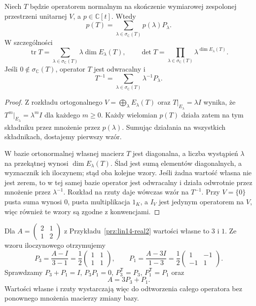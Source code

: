 \begin{wniosek}
\label{cor:lin14-functional-polynomial}
Niech \(T\) będzie operatorem normalnym
na skończenie wymiarowej zespolonej
przestrzeni unitarnej \(V\),
a \(p\in\mathbb C[t]\).
Wtedy
\[
 p(T)=\sum_{\lambda\in\sigma_{\mathbb C}(T)}
                                  p(\lambda)P_\lambda.
\]
W szczególności
\[
 \operatorname{tr}T
 =\sum_{\lambda\in\sigma_{\mathbb C}(T)}
                         \lambda\dim E_\lambda(T),
 \qquad
 \det T
 =\prod_{\lambda\in\sigma_{\mathbb C}(T)}
                         \lambda^{\dim E_\lambda(T)}.
\]
Jeśli \(0\notin\sigma_{\mathbb C}(T)\),
operator \(T\) jest odwracalny i
\[
 T^{-1}=\sum_{\lambda\in\sigma_{\mathbb C}(T)}
                         \lambda^{-1}P_\lambda.
\]
\end{wniosek}
\begin{proof}
Z rozkładu ortogonalnego
\(V=\bigoplus_\lambda E_\lambda(T)\)
oraz \(T|_{E_\lambda}=\lambda I\)
wynika, że
\(T^m|_{E_\lambda}=\lambda^mI\)
dla każdego \(m\ge0\).
Każdy wielomian \(p(T)\)
działa zatem na tym składniku
przez mnożenie przez \(p(\lambda)\).
Sumując działania na wszystkich
składnikach, dostajemy
pierwszy wzór.

W bazie ortonormalnej własnej
macierz \(T\) jest diagonalna,
a liczba wystąpień
\(\lambda\) na przekątnej
wynosi \(\dim E_\lambda(T)\).
Ślad jest sumą elementów
diagonalnych, a wyznacznik ich
iloczynem; stąd oba kolejne wzory.
Jeśli żadna wartość własna
nie jest zerem, to w tej
samej bazie operator jest
odwracalny i działa odwrotnie
przez mnożenie przez
\(\lambda^{-1}\).
Rozkład na rzuty daje
wówczas wzór na \(T^{-1}\).
Przy \(V=\{0\}\) pusta suma
wynosi \(0\), pusta multiplikacja
\(1_K\), a \(I_V\) jest
jedynym operatorem na \(V\),
więc również te wzory
są zgodne z konwencjami.
\end{proof}

\begin{przyklad}
\label{prz:lin14-spectral-projectors}
Dla
\(A=\begin{pmatrix}2&1\\1&2\end{pmatrix}\)
z Przykładu~\ref{prz:lin14-real2}
wartości własne to \(3\) i \(1\).
Ze wzoru iloczynowego otrzymujemy
\[
 P_3=\frac{A-I}{3-1}
 =\frac12\begin{pmatrix}1&1\\1&1\end{pmatrix},
 \qquad
 P_1=\frac{A-3I}{1-3}
 =\frac12\begin{pmatrix}1&-1\\-1&1\end{pmatrix}.
\]
Sprawdzamy
\(P_3+P_1=I\),
\(P_3P_1=0\),
\(P_3^{\mathsf T}=P_3\),
\(P_1^{\mathsf T}=P_1\)
oraz
\[
 A=3P_3+P_1.
\]
Wartości własne i rzuty
wystarczają więc do odtworzenia
całego operatora bez
ponownego mnożenia macierzy
zmiany bazy.
\end{przyklad}

